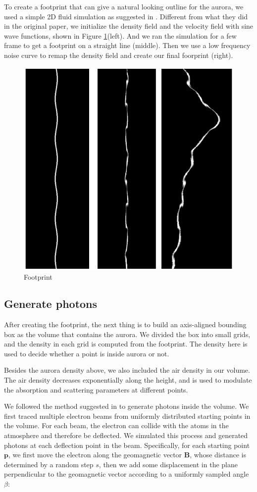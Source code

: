 \documentclass[10pt,a4paper]{article}
\begin{document}
To create a footprint that can give a natural looking outline for the 
aurora, we used a simple 2D fluid simulation as suggested in \cite{lawlor2011interactive}.
Different from what they did in the original paper, we initialize the 
density field and the velocity field with sine wave functions, shown in 
Figure \ref{fig:foorprint}(left). And we ran the simulation for a few frame to get a footprint 
on a straight line (middle). Then we use a low frequency noise curve to remap 
the density field and create our final foorprint (right).

\begin{figure}[h]
\centering
\includegraphics[width=0.7\linewidth]{./footprint}
\caption{Footprint}
\label{fig:foorprint}
\end{figure}


\subsection{Generate photons}

After creating the footprint, the next thing is to build an axis-aligned bounding box as the volume that contains the aurora. We divided the box into small grids, and the density in each grid is computed from the footprint. The density here is used to decide whether a point is inside aurora or not.

Besides the aurora density above, we also included the air density in our volume. The air density decreases exponentially along the height, and is used to modulate the absorption and scattering parameters at different points.

We followed the method suggested in \cite{baranoski2000simulating} to generate photons inside the volume. We first traced multiple electron beams from uniformly distributed starting points in the volume. For each beam, the electron can collide with the atoms in the atmosphere and therefore be deflected. We simulated this process and generated photons at each deflection point in the beam. Specifically, for each starting point $\mathbf{p}$, we first move the electron along the geomagnetic vector $\mathbf{B}$, whose distance is determined by a random step $s$, then we add some displacement in the plane perpendicular to the geomagnetic vector according to a uniformly sampled angle $\beta$:
\end{document}
